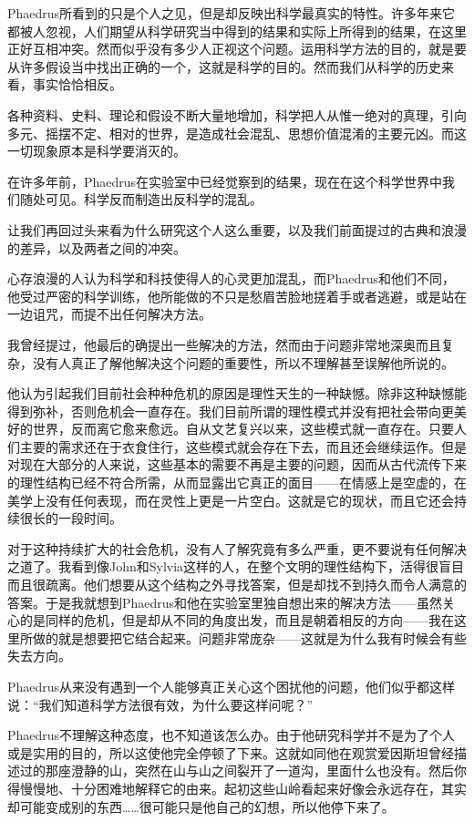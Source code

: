 \documentclass[UTF8]{article}
\begin{document}
\par Phaedrus所看到的只是个人之见，但是却反映出科学最真实的特性。许多年来它都被人忽视，人们期望从科学研究当中得到的结果和实际上所得到的结果，在这里正好互相冲突。然而似乎没有多少人正视这个问题。运用科学方法的目的，就是要从许多假设当中找出正确的一个，这就是科学的目的。然而我们从科学的历史来看，事实恰恰相反。
\par 各种资料、史料、理论和假设不断大量地增加，科学把人从惟一绝对的真理，引向多元、摇摆不定、相对的世界，是造成社会混乱、思想价值混淆的主要元凶。而这一切现象原本是科学要消灭的。
\par 在许多年前，Phaedrus在实验室中已经觉察到的结果，现在在这个科学世界中我们随处可见。科学反而制造出反科学的混乱。
\par 让我们再回过头来看为什么研究这个人这么重要，以及我们前面提过的古典和浪漫的差异，以及两者之间的冲突。
\par 心存浪漫的人认为科学和科技使得人的心灵更加混乱，而Phaedrus和他们不同，他受过严密的科学训练，他所能做的不只是愁眉苦脸地搓着手或者逃避，或是站在一边诅咒，而提不出任何解决方法。
\par 我曾经提过，他最后的确提出一些解决的方法，然而由于问题非常地深奥而且复杂，没有人真正了解他解决这个问题的重要性，所以不理解甚至误解他所说的。
\par 他认为引起我们目前社会种种危机的原因是理性天生的一种缺憾。除非这种缺憾能得到弥补，否则危机会一直存在。我们目前所谓的理性模式并没有把社会带向更美好的世界，反而离它愈来愈远。自从文艺复兴以来，这些模式就一直存在。只要人们主要的需求还在于衣食住行，这些模式就会存在下去，而且还会继续运作。但是对现在大部分的人来说，这些基本的需要不再是主要的问题，因而从古代流传下来的理性结构已经不符合所需，从而显露出它真正的面目——在情感上是空虚的，在美学上没有任何表现，而在灵性上更是一片空白。这就是它的现状，而且它还会持续很长的一段时间。
\par 对于这种持续扩大的社会危机，没有人了解究竟有多么严重，更不要说有任何解决之道了。我看到像John和Sylvia这样的人，在整个文明的理性结构下，活得很盲目而且很疏离。他们想要从这个结构之外寻找答案，但是却找不到持久而令人满意的答案。于是我就想到Phaedrus和他在实验室里独自想出来的解决方法——虽然关心的是同样的危机，但是却从不同的角度出发，而且是朝着相反的方向——我在这里所做的就是想要把它结合起来。问题非常庞杂——这就是为什么我有时候会有些失去方向。
\par Phaedrus从来没有遇到一个人能够真正关心这个困扰他的问题，他们似乎都这样说：“我们知道科学方法很有效，为什么要这样问呢？”
\par Phaedrus不理解这种态度，也不知道该怎么办。由于他研究科学并不是为了个人或是实用的目的，所以这使他完全停顿了下来。这就如同他在观赏爱因斯坦曾经描述过的那座澄静的山，突然在山与山之间裂开了一道沟，里面什么也没有。然后你得慢慢地、十分困难地解释它的由来。起初这些山岭看起来好像会永远存在，其实却可能变成别的东西……很可能只是他自己的幻想，所以他停下来了。
\end{document}
